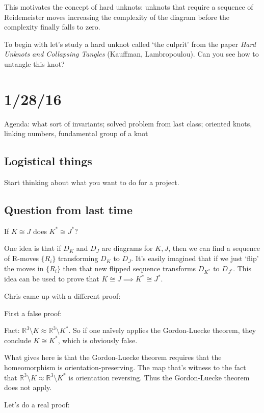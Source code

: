 \documentclass[11pt]{article}
\newcommand{\R}{\mathbb{R}}
\newcommand{\set}[1]{\{ #1 \}}
\theoremstyle{plain}
\theoremstyle{definition}
\begin{document}
This motivates the concept of hard unknots: unknots that require a sequence of Reidemeister moves increasing the complexity of the diagram before the complexity finally falls to zero.


To begin with let's study a hard unknot called `the culprit' from the paper \emph{Hard Unknots and Collapsing Tangles} (Kauffman, Lambropoulou). Can you see how to untangle this knot?

\clearpage
\section{1/28/16}

Agenda: what sort of invariants; solved problem from last class;
oriented knots, linking numbers, fundamental group of a knot

\subsection{Logistical things}

Start thinking about what you want to do for a project.


\subsection{Question from last time}

If $K \cong J$ does $K^\ast \cong J^\ast$?

One idea is that if $D_K$  and $D_J$ are diagrams for $K, J$, then we can find a sequence of R-moves $\set{R_i}$ transforming $D_K$ to $D_J$. It's easily imagined that if we just `flip' the moves in $\set{R_i}$ then
that new flipped sequence transforms $D_{K^\ast}$ to $D_{J^\ast}$. This idea can be used to prove that $K \cong J \implies K^\ast \cong J^\ast$.

Chris came up with a different proof:

First a false proof:

Fact: $\R^3 \setminus K \approx \R^3 \setminus K^\ast$. So if one na\"ively applies the Gordon-Luecke theorem, they conclude $K \cong K^\ast$, which is obviously false.

What gives here is that the Gordon-Luecke theorem requires that the homeomorphism is orientation-preserving. The map that's witness to the fact that $\R^3 \setminus K \approx \R^3 \setminus K^\ast$ is orientation reversing. Thus
the Gordon-Luecke theorem does not apply.

Let's do a real proof:
\end{document}
